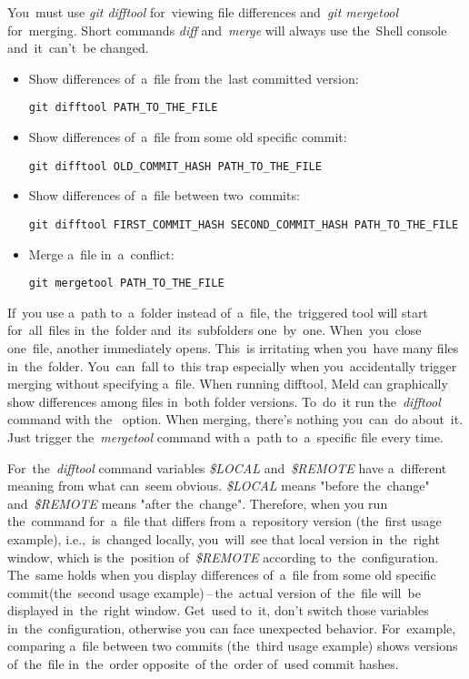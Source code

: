 You~must use \textit{git difftool} for~viewing file differences and~\textit{git mergetool} for~merging. Short commands \textit{diff} and~\textit{merge} will always use the~Shell console and~it~can't~be changed.

\begin{itemize}
    \item Show differences of~a~file from the~last committed version:
        \begin{lstlisting}[frame=no, gobble=12]
            git difftool PATH_TO_THE_FILE
        \end{lstlisting}
    \item Show differences of~a~file from some old specific commit:
        \begin{lstlisting}[frame=no, gobble=12]
            git difftool OLD_COMMIT_HASH PATH_TO_THE_FILE
        \end{lstlisting}
    \item Show differences of~a~file between two~commits:
        \begin{lstlisting}[frame=no, gobble=12]
            git difftool FIRST_COMMIT_HASH SECOND_COMMIT_HASH PATH_TO_THE_FILE
        \end{lstlisting}
    \item Merge a~file in~a~conflict:
        \begin{lstlisting}[frame=no, gobble=12]
            git mergetool PATH_TO_THE_FILE
        \end{lstlisting}
\end{itemize}

\warningnonl If~you use a~path to~a~folder instead of~a~file, the~triggered tool will start for~all~files in~the~folder and~its~subfolders one~by~one. When~you~close one~file, another immediately opens. This~is irritating when you~have many files in~the~folder. You~can~fall to~this trap especially when you~accidentally trigger merging without specifying a~file. When running difftool, Meld can graphically show differences among files in~both folder versions. To~do~it run the~\textit{difftool} command with the~ option. When merging, there's nothing you~can~do about~it. Just trigger the~\textit{mergetool} command with a~path to~a~specific file every time.

\warning For~the~\textit{difftool} command variables \textit{\$LOCAL} and~\textit{\$REMOTE} have a~different meaning from what can~seem obvious. \textit{\$LOCAL} means "before the~change" and~\textit{\$REMOTE} means "after the~change". Therefore, when you run the~command for~a~file that differs from a~repository version (the~first usage example), i.e.,~is~changed locally, you~will~see that local version in~the~right window, which is the~position of~\textit{\$REMOTE} according to~the~configuration. The~same holds when you display differences of~a~file from some old specific commit(the~second usage example)\,--\,the~actual version of~the~file will~be displayed in~the~right window. Get~used to~it, don't switch those variables in~the~configuration, otherwise you can face unexpected behavior. For~example, comparing a~file between two commits (the~third usage example) shows versions of~the~file in~the~order opposite~of the~order of~used commit hashes.

